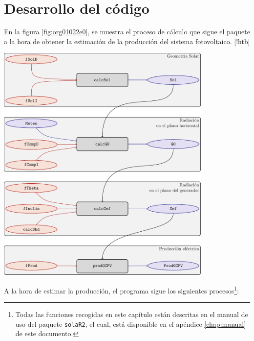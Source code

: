 \chapter{Desarrollo del código}
\label{chap:desarrollo-codigo}
\makeatletter
\renewenvironment{figure}[1][H]{%
     	\@float{figure}[#1]%
		\precaption{\rule{\linewidth}{0.4pt}\par}%
		\centering
		  }{%
    	\end@float	
}
\makeatother

En la figura \ref{fig:org01022e0}, se muestra el proceso de cálculo que sigue el paquete a la hora de obtener la estimación de la producción del sistema fotovoltaico.
\begin{figure}[!htb]
\centering
\includegraphics[keepaspectratio,width=0.8\textwidth,height=0.43\textheight]{figuras/procedure.pdf}
\caption{\label{fig:org01022e0}Proceso de cálculo de las funciones de \texttt{solaR2}}
\end{figure}
A la hora de estimar la producción, el programa sigue los siguientes procesos\footnote{Todas las funciones recogidas en este capítulo están descritas en el manual de uso del paquete \texttt{solaR2}, el cual, está disponible en el apéndice \ref{chap:manual} de este documento.}:
